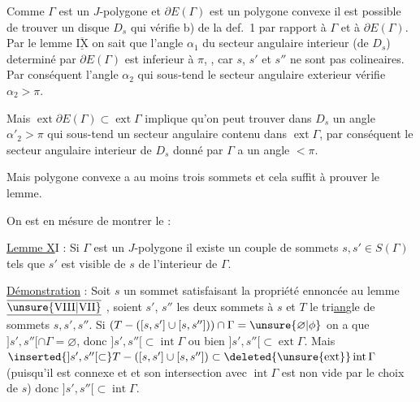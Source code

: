 Comme $\Gamma$ est un $J$-polygone et $\partial E(\Gamma)$ est un polygone convexe il est possible de trouver un disque $D_s$ qui vérifie b) de la def.~1 par rapport à $\Gamma$ et à $\partial E(\Gamma)$. Par le lemme $\underline{\overline{\mathrm{IX}}}$ on sait que l'angle $\alpha_1$ du secteur angulaire interieur (de $D_s$) determiné par $\partial E(\Gamma)$ est inferieur à $\pi$, , car $s$, $s'$ et $s''$ ne sont pas colineaires. Par conséquent l'angle $\alpha_2$ qui sous-tend le secteur angulaire exterieur vérifie $\alpha_2>\pi$.

Mais $\operatorname{ext}\partial E(\Gamma)\subset\operatorname{ext}\Gamma$ implique qu'on peut trouver dans $D_s$ un angle $\alpha'_2>\pi$ qui sous-tend un secteur angulaire contenu dans $\operatorname{ext}\Gamma$, par conséquent le secteur angulaire interieur de $D_s$  donné par $\Gamma$ a un angle $<\pi$.

Mais  polygone convexe a au moins trois sommets et cela suffit à prouver le lemme.

On est en mésure de montrer le :

\uline{Lemme X}I : Si $\Gamma$ est un $J$-polygone  il existe un couple de sommets $s,s'\in S(\Gamma)$ tels que $s'$ est visible de $s$ de l'interieur de $\Gamma$.


\uline{Démonstration} : Soit $s$ un sommet satisfaisant la propriété ennoncée au lemme $\underline{\overline{\mathrm{\unsure{VIII|VII}}}}$%
, soient $s'$, $s''$ les deux sommets   à $s$ et $T$ le tri\uline{an}gle%
 de sommets $s,s',s''$. Si $(T-([s,s']\cup[s,s'']))\cap\Gamma=\unsure{\varnothing|\phi}$ on a que $]s',s''[\cap\Gamma=\varnothing$, donc $]s',s''[\subset\operatorname{int}\Gamma$ ou bien $]s',s''[\subset\operatorname{ext}\Gamma$. Mais $\inserted{]s',s''[\subset}T-([s,s']\cup[s,s''])\subset\deleted{\unsure{\operatorname{ext}}}\operatorname{int}\Gamma$ (puisqu'il est connexe et et son intersection avec $\operatorname{int}\Gamma$ est non vide par le choix de $s$) donc $]s',s''[\subset\operatorname{int}\Gamma$.

